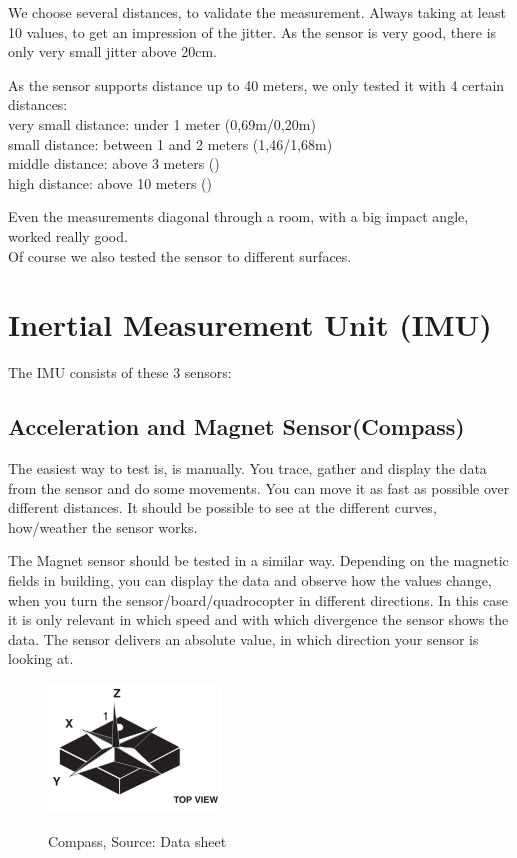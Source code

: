 We choose several distances, to validate the measurement. Always taking at least 10 values, to get an impression of the jitter. As the sensor is very good, there is only very small jitter above 20cm.

As the sensor supports distance up to 40 meters, we only tested it with 4 certain distances:\\
very small distance: under 1 meter (0,69m/0,20m)\\
small distance: between 1 and 2 meters (1,46/1,68m)\\
middle distance: above 3 meters ()\\
high distance: above 10 meters ()

Even the measurements diagonal through a room, with a big impact angle, worked really good.\\
Of course we also tested the sensor to different surfaces.


\section{Inertial Measurement Unit (IMU)}

The IMU consists of these 3 sensors:

\subsection{Acceleration and Magnet Sensor(Compass)}

The easiest way to test is, is manually. You trace, gather and display the data from the sensor and do some movements. You can move it as fast as possible over different distances. It should be possible to see at the different curves, how/weather the sensor works.

The Magnet sensor should be tested in a similar way. Depending on the magnetic fields in building, you can display the data and observe how the values change, when you turn the sensor/board/quadrocopter in different directions. In this case it is only relevant in which speed and with which divergence the sensor shows the data. The sensor delivers an absolute value, in which direction your sensor is looking at.


\begin{figure}[H]
	\centering
		\includegraphics{fig/compass.png}%
	\label{fig:IMU_com}
	\caption{Compass, Source: Data sheet}
\end{figure}


